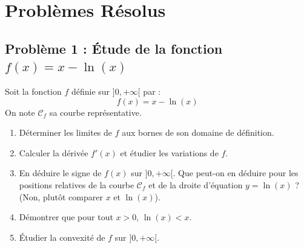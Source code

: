 \section{Problèmes Résolus}

\subsection*{Problème 1 : Étude de la fonction $f(x) = x - \ln(x)$}
Soit la fonction $f$ définie sur $]0, +\infty[$ par :
\[
f(x) = x - \ln(x)
\]
On note $\mathcal{C}_f$ sa courbe représentative.
\begin{enumerate}
    \item Déterminer les limites de $f$ aux bornes de son domaine de définition.
    \item Calculer la dérivée $f'(x)$ et étudier les variations de $f$.
    \item En déduire le signe de $f(x)$ sur $]0, +\infty[$. Que peut-on en déduire pour les positions relatives de la courbe $\mathcal{C}_f$ et de la droite d'équation $y = \ln(x)$ ? (Non, plutôt comparer $x$ et $\ln(x)$).
    \item Démontrer que pour tout $x > 0$, $\ln(x) < x$.
    \item Étudier la convexité de $f$ sur $]0, +\infty[$.
\end{enumerate}

